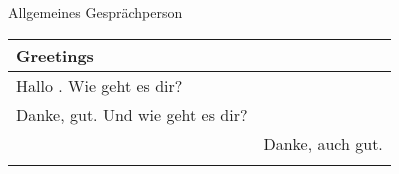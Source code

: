 \begin{discourse}{Allgemeines Gespräch}{person}
\begin{tabular}{l|l}
	\multicolumn{2}{l}{\textbf{Greetings}} \\
	\hline
	Hallo \fillhere . Wie geht es dir? & \\
	Danke, gut. Und wie geht es dir? & \\
	& Danke, auch gut. \\
	\multicolumn{2}{l}{}
\end{tabular}
\end{discourse}
